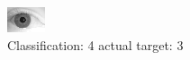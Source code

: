 \begin{figure}[h!]
\begin{center}
\includegraphics[width=0.60\columnwidth]{figures/ID2143_class_4_target_3.png}
\end{center}
\caption{ Classification: 4 actual target: 3}
\label{fig:ID2143_class_4_target_3}
\end{figure}
